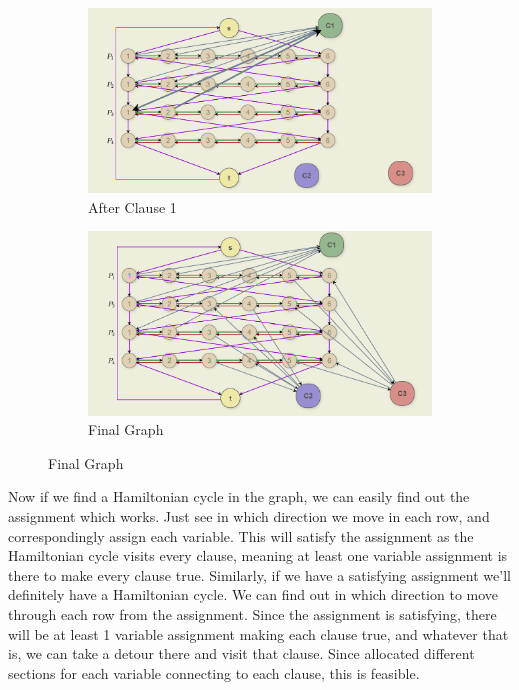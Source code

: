 \documentclass[12pt]{report}
\begin{document}
\begin{enumerate}[label=\textbf{\arabic*.}]
    \begin{figure}[H]
        \centering
        \begin{subfigure}[b]{0.45\textwidth}
            \centering
            \includegraphics[width=\textwidth]{C1Hamiltonian.png}
            \caption*{After Clause 1}
        \end{subfigure}
        \hfill
        \begin{subfigure}[b]{0.45\textwidth}
            \centering
            \includegraphics[width=\textwidth]{FinalHamiltonian.png}
            \caption*{Final Graph}
        \end{subfigure}
    \end{figure}

    Now if we find a Hamiltonian cycle in the graph, we can easily find out the assignment which works. Just see in which direction we move in 
    each row, and correspondingly assign each variable. This will satisfy the assignment as the Hamiltonian cycle visits every clause, meaning 
    at least one variable assignment is there to make every clause true. Similarly, if we have a satisfying assignment we'll definitely have a
    Hamiltonian cycle. We can find out in which direction to move through each row from the assignment. Since the assignment is satisfying, there 
    will be at least 1 variable assignment making each clause true, and whatever that is, we can take a detour there and visit that clause. Since
    allocated different sections for each variable connecting to each clause, this is feasible.


\end{enumerate}
\end{document}
